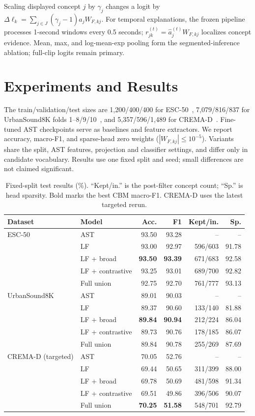 \documentclass[runningheads]{llncs}
\begin{document}
Scaling displayed concept $j$ by $\gamma_j$ changes a logit by $\Delta\ell_k=\sum_{j\in J}(\gamma_j-1)\hat a_jW_{F,kj}$. For temporal explanations, the frozen pipeline processes 1-second windows every 0.5 seconds; $r^{(t)}_{jk}=\hat a^{(t)}_jW_{F,kj}$ localizes concept evidence. Mean, max, and log-mean-exp pooling form the segmented-inference ablation; full-clip logits remain primary.

\section{Experiments and Results}
The train/validation/test sizes are 1,200/400/400 for ESC-50~\cite{piczak2015esc}, 7,079/816/837 for UrbanSound8K folds 1--8/9/10~\cite{salamon2014urbansound}, and 5,357/596/1,489 for CREMA-D~\cite{cao2014cremad}. Fine-tuned AST checkpoints serve as baselines and feature extractors. We report accuracy, macro-F1, and sparse-head zero weights ($|W_{F,kj}|\leq10^{-5}$). Variants share the split, AST features, projection and classifier settings, and differ only in candidate vocabulary. Results use one fixed split and seed; small differences are not claimed significant.

\begin{table}[t]
\caption{Fixed-split test results (\%). ``Kept/in.'' is the post-filter concept count; ``Sp.'' is head sparsity. Bold marks the best CBM macro-F1. CREMA-D uses the latest targeted rerun.}
\label{tab:results}
\centering
\footnotesize
\setlength{\tabcolsep}{2.7pt}
\renewcommand{\arraystretch}{0.90}
\begin{tabular}{@{}llrrrr@{}}
\toprule
Dataset & Model & Acc. & F1 & Kept/in. & Sp. \\
\midrule
ESC-50 & AST & 93.50 & 93.28 & -- & -- \\
 & LF & 93.00 & 92.97 & 596/603 & 91.78 \\
 & LF + broad & \textbf{93.50} & \textbf{93.39} & 671/683 & 92.58 \\
 & LF + contrastive & 93.25 & 93.01 & 689/700 & 92.82 \\
 & Full union & 92.75 & 92.70 & 761/777 & 93.13 \\
\midrule
UrbanSound8K & AST & 89.01 & 90.03 & -- & -- \\
 & LF & 89.37 & 90.60 & 133/140 & 81.88 \\
 & LF + broad & \textbf{89.84} & \textbf{90.94} & 212/224 & 86.04 \\
 & LF + contrastive & 89.73 & 90.76 & 178/185 & 86.07 \\
 & Full union & 89.84 & 90.78 & 255/269 & 87.69 \\
\midrule
CREMA-D (targeted) & AST & 70.05 & 52.76 & -- & -- \\
 & LF & 69.44 & 50.65 & 311/399 & 88.00 \\
 & LF + broad & 69.78 & 50.69 & 481/598 & 91.34 \\
 & LF + contrastive & 69.51 & 49.86 & 396/506 & 90.07 \\
 & Full union & \textbf{70.25} & \textbf{51.58} & 548/701 & 92.79 \\
\bottomrule
\end{tabular}
\end{table}
\end{document}
